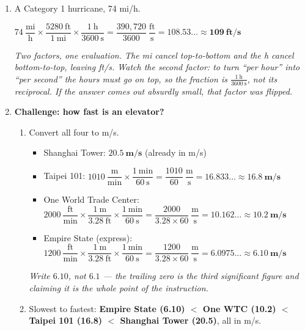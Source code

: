 \documentclass[12pt, twoside]{article}
\begin{document}
\begin{enumerate}[itemsep=0.25cm]
\item A Category 1 hurricane, 74 mi/h.

  $74~\dfrac{\text{mi}}{\text{h}} \times \dfrac{5280~\text{ft}}{1~\text{mi}}
  \times \dfrac{1~\text{h}}{3600~\text{s}}
  = \dfrac{390{,}720}{3600}~\dfrac{\text{ft}}{\text{s}} = 108.53\ldots
  \approx \mathbf{109~\textbf{ft/s}}$

  \emph{Two factors, one evaluation. The mi cancel top-to-bottom and the h cancel
  bottom-to-top, leaving ft/s. Watch the second factor: to turn ``per hour'' into ``per
  second'' the hours must go on top, so the fraction is $\frac{1~\text{h}}{3600~\text{s}}$,
  not its reciprocal. If the answer comes out absurdly small, that factor was flipped.}

\newpage

\item \textbf{Challenge: how fast is an elevator?}
  \begin{enumerate}[itemsep=0.3cm]
    \item Convert all four to m/s.
      \begin{itemize}[itemsep=0.28cm]
        \item Shanghai Tower: $\mathbf{20.5~\textbf{m/s}}$ (already in m/s)
        \item Taipei 101: $1010~\dfrac{\text{m}}{\text{min}} \times
          \dfrac{1~\text{min}}{60~\text{s}} = \dfrac{1010}{60}~\dfrac{\text{m}}{\text{s}}
          = 16.833\ldots \approx \mathbf{16.8~\textbf{m/s}}$
        \item One World Trade Center: $2000~\dfrac{\text{ft}}{\text{min}} \times
          \dfrac{1~\text{m}}{3.28~\text{ft}} \times \dfrac{1~\text{min}}{60~\text{s}}
          = \dfrac{2000}{3.28 \times 60}~\dfrac{\text{m}}{\text{s}} = 10.162\ldots
          \approx \mathbf{10.2~\textbf{m/s}}$
        \item Empire State (express): $1200~\dfrac{\text{ft}}{\text{min}} \times
          \dfrac{1~\text{m}}{3.28~\text{ft}} \times \dfrac{1~\text{min}}{60~\text{s}}
          = \dfrac{1200}{3.28 \times 60}~\dfrac{\text{m}}{\text{s}} = 6.0975\ldots
          \approx \mathbf{6.10~\textbf{m/s}}$
      \end{itemize}
      \vspace{0.1cm}
      \emph{Write $6.10$, not $6.1$ --- the trailing zero is the third significant figure
      and claiming it is the whole point of the instruction.}

    \item Slowest to fastest: \textbf{Empire State (6.10) $<$ One WTC (10.2) $<$ Taipei
      101 (16.8) $<$ Shanghai Tower (20.5)}, all in m/s.


\end{enumerate}
\end{enumerate}
\end{document}
